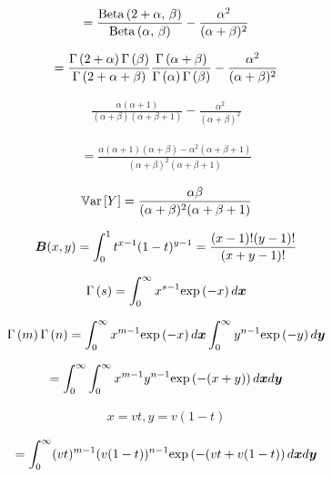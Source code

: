 \documentclass[12pt]{article}
\begin{document}
\begin{enumerate}
\begin{align*}
    = \frac{\mathrm{Beta}\left(2 + \alpha,\,\beta\right)}{\mathrm{Beta}\left(\alpha,\,\beta\right)} - \frac{\alpha^2}{(\alpha + \beta)^2}
 \end{align*}
 
\begin{align*}
   =  \frac{\Gamma\left(2 + \alpha\right) \Gamma\left(\beta\right)}{\Gamma\left(2 + \alpha + \beta\right)} \frac{\Gamma\left(\alpha + \beta\right)}{\Gamma\left(\alpha\right) \Gamma\left(\beta\right)} - \frac{\alpha^2}{(\alpha + \beta)^2} 
\end{align*}

\begin{align*}
    \frac{\alpha(\alpha+1)}{(\alpha+\beta)(\alpha+\beta+1)} - \frac{\alpha^2}{(\alpha + \beta)^2}
\end{align*}

\begin{align*}
  = \frac{\alpha(\alpha+1)(\alpha+\beta) - \alpha^2(\alpha+\beta+1)}{(\alpha + \beta)^2(\alpha+\beta+1)}
\end{align*}

\begin{align*}
    \mathbb{V}\text{ar}\left[Y\right] = \frac{\alpha\beta}{(\alpha + \beta)^2(\alpha+\beta+1)}    
\end{align*}



\begin{align*}
    \boldsymbol{B}(x,y) = \int_{0}^{1}{t^{x-1}(1-t)^{y-1}} = \frac{(x-1)!(y-1)!}{(x+y-1)!}
\end{align*}

\begin{align*}
    \Gamma\left(s\right) = \int_{0}^{\infty}x^{s-1}\mathrm{exp}\left(-x\right)d\boldsymbol{x}
\end{align*}

\begin{align*}
    \Gamma\left(m\right)\Gamma\left(n\right) = \int_{0}^{\infty}x^{m-1}\mathrm{exp}\left(-x\right)d\boldsymbol{x} \int_{0}^{\infty} y^{n-1}\mathrm{exp}\left(-y\right)d\boldsymbol{y}
\end{align*}

\begin{align*}
    = \int_{0}^{\infty}\int_{0}^{\infty}x^{m-1}y^{n-1}\mathrm{exp}\left(-(x+y)\right)d\boldsymbol{x} d\boldsymbol{y}
\end{align*}

\begin{align*}
   x = v t ,  y = v(1-t)
\end{align*}

\begin{align*}
    =  \int_{0}^{\infty}(v t)^{m-1}(v(1-t))^{n-1}\mathrm{exp}\left(-(v t + v(1 - t)\right)d\boldsymbol{x} d\boldsymbol{y}
\end{align*}


\end{enumerate}
\end{document}
